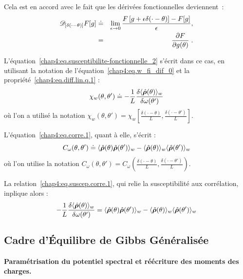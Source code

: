 Cela est en accord avec le fait que les dérivées fonctionnelles deviennent :
\begin{eqnarray}\label{chap4:eq.w_fi_dif_0}
	\mathscr{D}_{[\delta(\cdot - \theta)]} F[g] &\doteq& \lim_{\epsilon \to 0} \frac{F\left[g + \epsilon \delta(\cdot - \theta)\right] - F[g]}{\epsilon}, \\
	& = & \left. \frac{\partial F}{\partial g(\theta)} \right. .
\end{eqnarray}



L’équation~\eqref{chap4:eq.susceptibilite-fonctionnelle_2} s’écrit dans ce cas, en utilisant la notation de l’équation~\eqref{chap4:eq.w_fi_dif_0} et la propriété~\eqref{chap4:eq.diff.lin.q.1} :
\begin{equation}\label{chap4:eq.susceptibilite-fonctionnelle_3}
	\chi_w(\theta, \theta') \doteq -\frac{1}{L} \frac{\delta \langle \hat{\bm{\rho}}(\theta) \rangle_w}{\delta \omega(\theta')} 
\end{equation}
où l’on a utilisé la notation $\chi_w(\theta, \theta') = \chi_w\left[\frac{\delta(\cdot - \theta)}{L}, \frac{\delta(\cdot - \theta')}{L} \right]$.

L’équation~\eqref{chap4:eq.corre.1}, quant à elle, s’écrit :
\begin{equation}\label{chap4:eq.corre.2}
C_\omega(\theta, \theta') \doteq \langle \hat{\bm{\rho}}(\theta) \hat{\bm{\rho}}(\theta') \rangle_w - \langle \hat{\bm{\rho}}(\theta) \rangle_w \langle \hat{\bm{\rho}}(\theta') \rangle_w 
\end{equation}
où l’on utilise la notation $C_\omega(\theta, \theta') = C_\omega\left( \frac{\delta(\cdot - \theta)}{L}, \frac{\delta(\cdot - \theta')}{L} \right)$.

La relation~\eqref{chap4:eq.suscep.corre.1}, qui relie la susceptibilité aux corrélation, inplique alors :
\begin{equation}
-\frac{1}{L} \frac{\delta \langle \hat{\bm{\rho}}(\theta) \rangle_w}{\delta \omega(\theta')} = \langle \hat{\bm{\rho}}(\theta) \hat{\bm{\rho}}(\theta') \rangle_w - \langle \hat{\bm{\rho}}(\theta) \rangle_w \langle \hat{\bm{\rho}}(\theta') \rangle_w 
\end{equation}


\subsection{Cadre d'Équilibre de Gibbs Généralisée}

\paragraph{Paramétrisation du potentiel spectral et réécriture des moments des charges.}
